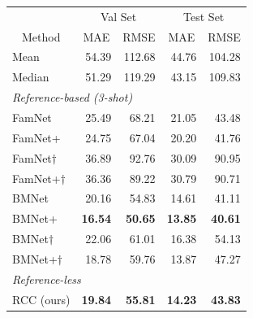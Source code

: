 \begin{tabular}{lrrrr}
 \toprule

 & \multicolumn{2}{c}{Val Set} & \multicolumn{2}{c}{Test Set} \\
\multicolumn{1}{c}{Method} & \multicolumn{1}{c}{MAE} & \multicolumn{1}{c}{RMSE} & \multicolumn{1}{c}{MAE} & \multicolumn{1}{c}{RMSE} \\
\midrule
Mean & 54.39 & 112.68 & 44.76 & 104.28 \\
Median & 51.29 & 119.29 & 43.15 & 109.83 \\
    \midrule

\multicolumn{3}{l}{\textit{Reference-based (3-shot)}} \\
FamNet 
 \cite{ranjan2021Famnet}
& 25.49 & 68.21 & 21.05 & 43.48 \\
FamNet+ 
 \cite{ranjan2021Famnet}
& 24.75 & 67.04
 &  20.20 & 41.76  \\ 
FamNet$\dag$ 
 \cite{ranjan2021Famnet}  &  
 36.89 & 92.76 & 30.09 & 90.95 \\ 
FamNet+$\dag$ 
 \cite{ranjan2021Famnet}
 & 36.36 & 89.22 &  30.79 & 90.71\\ 
BMNet 
 \cite{shi2022represent} & 20.16 & 54.83  & 14.61  & 41.11 \\
BMNet+ 
 \cite{shi2022represent}
&\textbf{16.54} &  \textbf{50.65}  & \textbf{13.85}  & \textbf{40.61}  \\
BMNet$\dag$ 
 \cite{shi2022represent}
& 22.06 & 61.01 & 16.38 & 54.13\\ 
BMNet+$\dag$  
 \cite{shi2022represent}
& 18.78 & 59.76  & 13.87  & 47.27  \\
\midrule
\multicolumn{3}{l}{\textit{Reference-less}} \\
RCC (ours) & \textbf{19.84}  & \textbf{55.81} & \textbf{14.23}  & \textbf{43.83} \\
\bottomrule
\end{tabular}
